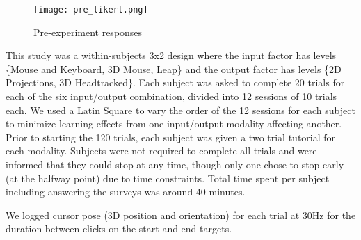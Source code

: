 \begin{figure}
    \centering
    \texttt{[image: pre\_likert.png]}
    \caption{Pre-experiment responses}
    \label{fig:pre_likert}
\end{figure}

This study was a within-subjects 3x2 design where the input factor has levels
\{Mouse and Keyboard, 3D Mouse, Leap\} and the output factor has levels \{2D
Projections, 3D Headtracked\}.  Each subject was asked to complete 20 trials
for each of the six input/output combination, divided into 12 sessions of 10
trials each.  We used a Latin Square to vary the order of the 12 sessions for
each subject to minimize learning effects from one input/output modality
affecting another.  Prior to starting the 120 trials, each subject was given a
two trial tutorial for each modality.  Subjects were not required to complete
all trials and were informed that they could stop at any time, though only one
chose to stop early (at the halfway point) due to time constraints.  Total
time spent per subject including answering the surveys was around 40 minutes.

We logged cursor pose (3D position and orientation) for each trial at 30Hz for
the duration between clicks on the start and end targets.

